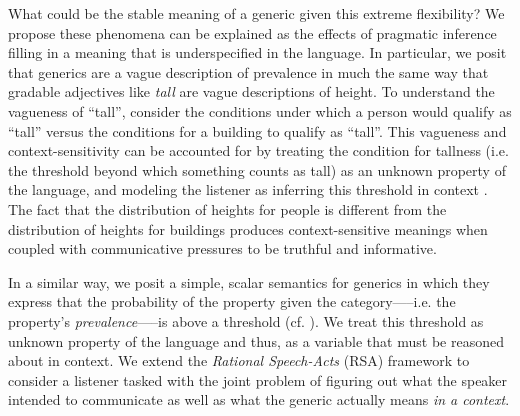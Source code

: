 \documentclass[10pt,letterpaper]{article}
\begin{document}
What could be the stable meaning of a generic given this extreme flexibility? 
We propose these phenomena can be explained as the effects of pragmatic inference filling in a meaning that is underspecified in the language. 
%
In particular, we posit that generics are a vague description of prevalence in much the same way that gradable adjectives like \emph{tall} are vague descriptions of height. 
To understand the vagueness of ``tall'', consider the conditions under which a person would qualify as ``tall'' versus the conditions for a building to qualify as ``tall''.
This vagueness and context-sensitivity can be accounted for by treating the condition for tallness (i.e. the threshold beyond which something counts as tall) as an unknown property of the language, and modeling the listener as inferring this threshold in context \cite{Lassiter2015}. 
The fact that the distribution of heights for people is different from the distribution of heights for buildings produces context-sensitive meanings when coupled 
with communicative pressures to be truthful and informative.
 

In a similar way, we posit a simple, scalar semantics for generics in which they express that the probability of the property given the category-----i.e. the property's \emph{prevalence}-----is above a threshold (cf. ). We treat this threshold as unknown property of the language and thus, as a variable that must be reasoned about in context. We extend the \emph{Rational Speech-Acts} (RSA) framework \cite{Frank2012,Goodman2013} to consider a listener tasked with the joint problem of figuring out what the speaker intended to communicate as well as what the generic actually means \emph{in a context}. 
\end{document}
